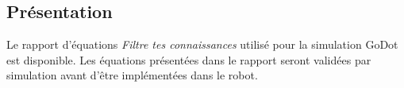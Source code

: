 \subsection{Présentation}
Le rapport d'équations \textit{Filtre tes connaissances} utilisé pour la simulation GoDot est disponible.
Les équations présentées dans le rapport seront validées par simulation avant d'être implémentées dans le robot.